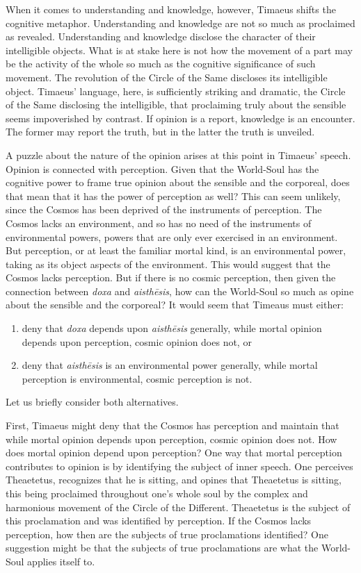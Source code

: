 When it comes to understanding and knowledge, however, Timaeus shifts the cognitive metaphor. Understanding and knowledge are not so much as proclaimed as revealed. Understanding and knowledge disclose the character of their intelligible objects. What is at stake here is not how the movement of a part may be the activity of the whole so much as the cognitive significance of such movement. The revolution of the Circle of the Same discloses its intelligible object. Timaeus' language, here, is sufficiently striking and dramatic, the Circle of the Same disclosing the intelligible, that proclaiming truly about the sensible seems impoverished by contrast. If opinion is a report, knowledge is an encounter. The former may report the truth, but in the latter the truth is unveiled.

A puzzle about the nature of the opinion arises at this point in Timaeus' speech. Opinion is connected with perception. Given that the World-Soul has the cognitive power to frame true opinion about the sensible and the corporeal, does that mean that it has the power of perception as well? This can seem unlikely, since the Cosmos has been deprived of the instruments of perception. The Cosmos lacks an environment, and so has no need of the instruments of environmental powers, powers that are only ever exercised in an environment. But perception, or at least the familiar mortal kind, is an environmental power, taking as its object aspects of the environment. This would suggest that the Cosmos lacks perception. But if there is no cosmic perception, then given the connection between \emph{doxa} and \emph{aisthēsis}, how can the World-Soul so much as opine about the sensible and the corporeal? It would seem that Timeaus must either:
\begin{enumerate}[(1)]
	\item deny that \emph{doxa} depends upon \emph{aisthēsis} generally, while mortal opinion depends upon perception, cosmic opinion does not, or
	\item deny that \emph{aisthēsis} is an environmental power generally, while mortal perception is environmental, cosmic perception is not. 
\end{enumerate}

Let us briefly consider both alternatives.

First, Timaeus might deny that the Cosmos has perception and maintain that while mortal opinion depends upon perception, cosmic opinion does not. How does mortal opinion depend upon perception? One way that mortal perception contributes to opinion is by identifying the subject of inner speech. One perceives Theaetetus, recognizes that he is sitting, and opines that Theaetetus is sitting, this being proclaimed throughout one's whole soul by the complex and harmonious movement of the Circle of the Different. Theaetetus is the subject of this proclamation and was identified by perception. If the Cosmos lacks perception, how then are the subjects of true proclamations identified? One suggestion might be that the subjects of true proclamations are what the World-Soul applies itself to. 

